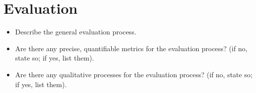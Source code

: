\section{Evaluation}

\begin{itemize}

    \item Describe the general evaluation process.

    \item Are there any precise, quantifiable metrics for the evaluation
        process? (if no, state so; if yes, list them).

    \item Are there any qualitative processes for the evaluation process? (if
        no, state so; if yes, list them).

\end{itemize}

